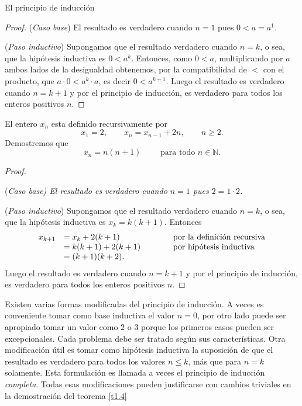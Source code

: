 \begin{section}{El principio de inducción}
\begin{proof}
\noindent ({\it Caso  base}) El resultado es verdadero
cuando $n=1$ pues $ 0 < a=a^1$.

\noindent ({\it Paso  inductivo})
 Supongamos que el resultado verdadero cuando $n=k$, o
sea, que la hipótesis inductiva es $0 < a^k$. Entonces, como $0<a$, multiplicando por $a$ ambos lados de la desigualdad obtenemos, por la compatibilidad de $<$ con el producto, que $a\cdot 0 < a^k \cdot a$, es decir $0<a^{k+1}$. 
Luego el resultado es verdadero cuando $n=k+1$ y por el principio de inducción, es verdadero para todos los enteros positivos $n$.
\end{proof}

\begin{ejemplo} El entero $x_n$ esta definido recursivamente por
$$
x_1=2, \qquad x_n=x_{n-1} +2n, \qquad n\ge 2.
$$
Demostremos que
$$
x_n = n(n+1) \qquad \text{ para todo } n\in \mathbb N.
$$
\end{ejemplo}
\begin{proof}
\	

\noindent(\it Caso  base\rm) El resultado es verdadero
cuando $n=1$ pues $ 2 = 1 \cdot 2$.

\noindent ({\it Paso  inductivo})
 Supongamos que el resultado verdadero cuando $n=k$, o
sea, que la hipótesis inductiva es $x_k = k(k+1)$. Entonces
$$
\begin{matrix} 
x_{k+1} &= x_k + 2(k+1) \hfill &\qquad &\text{por la definición recursiva} \hfill \\
&= k(k+1)+2(k+1) \hfill &\qquad &\text{por hipótesis inductiva}\hfill \\
&= (k+1)(k+2). \hfill &
\end{matrix}
$$
Luego el resultado es verdadero cuando $n=k+1$ y por el principio de inducción, es verdadero para todos los enteros positivos $n$.
\end{proof}


Existen varias formas modificadas del principio de inducción. A veces es conveniente tomar como base inductiva el valor $n=0$, por otro lado puede ser apropiado tomar un valor como $2$ o $3$ porque los primeros casos pueden ser excepcionales. Cada problema debe ser tratado según sus características. Otra modificación útil es tomar como hipótesis inductiva la suposición de que el resultado es verdadero para todos los valores $n\le k$, más que para $n=k$ solamente. Esta formulación es llamada a veces el principio de inducción {\it completa}. Todas esas modificaciones pueden justificarse con cambios triviales en la demostración del teorema \ref{t1.4}


\end{section}
